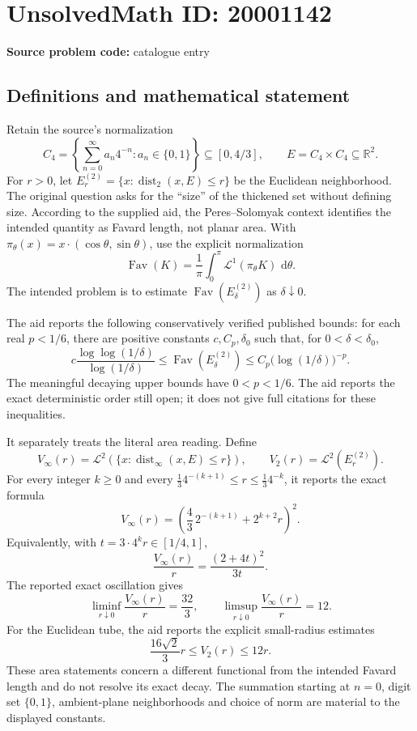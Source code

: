 \documentclass[11pt]{article}
\newcommand{\R}{\mathbb{R}}
\newcommand{\dd}{\,\mathrm{d}}
\begin{document}
\section*{UnsolvedMath ID: 20001142}
\textbf{Source problem code:} catalogue entry
\subsection{Definitions and mathematical statement}
Retain the source's normalization
\[
 C_4=\left\{\sum_{n=0}^{\infty}a_n4^{-n}:a_n\in\{0,1\}\right\}\subseteq[0,4/3],
 \qquad E=C_4\times C_4\subseteq\R^2.
\]
For \(r>0\), let \(E_r^{(2)}=\{x:\operatorname{dist}_2(x,E)\leq r\}\) be the Euclidean neighborhood. The original question asks for the ``size'' of the thickened set without defining size. According to the supplied aid, the Peres--Solomyak context identifies the intended quantity as Favard length, not planar area. With \(\pi_\theta(x)=x\cdot(\cos\theta,\sin\theta)\), use the explicit normalization
\[
 \operatorname{Fav}(K)=\frac1\pi\int_0^\pi\mathcal L^1(\pi_\theta K)\,\dd\theta.
\]
The intended problem is to estimate \(\operatorname{Fav}(E_\delta^{(2)})\) as \(\delta\downarrow0\).

The aid reports the following conservatively verified published bounds: for each real \(p<1/6\), there are positive constants \(c,C_p,\delta_0\) such that, for \(0<\delta<\delta_0\),
\[
 c\frac{\log\log(1/\delta)}{\log(1/\delta)}
 \leq\operatorname{Fav}(E_\delta^{(2)})
 \leq C_p\bigl(\log(1/\delta)\bigr)^{-p}.
\]
The meaningful decaying upper bounds have \(0<p<1/6\). The aid reports the exact deterministic order still open; it does not give full citations for these inequalities.

It separately treats the literal area reading. Define
\[
 V_\infty(r)=\mathcal L^2(\{x:\operatorname{dist}_\infty(x,E)\leq r\}),\qquad
 V_2(r)=\mathcal L^2(E_r^{(2)}).
\]
For every integer \(k\geq0\) and every
\(\frac13 4^{-(k+1)}\leq r\leq\frac13 4^{-k}\), it reports the exact formula
\[
 V_\infty(r)=\left(\frac43\,2^{-(k+1)}+2^{k+2}r\right)^2.
\]
Equivalently, with \(t=3\cdot4^kr\in[1/4,1]\),
\[
 \frac{V_\infty(r)}r=\frac{(2+4t)^2}{3t}.
\]
The reported exact oscillation gives
\[
 \liminf_{r\downarrow0}\frac{V_\infty(r)}r=\frac{32}{3},\qquad
 \limsup_{r\downarrow0}\frac{V_\infty(r)}r=12.
\]
For the Euclidean tube, the aid reports the explicit small-radius estimates
\[
 \frac{16\sqrt2}{3}r\leq V_2(r)\leq12r.
\]
These area statements concern a different functional from the intended Favard length and do not resolve its exact decay. The summation starting at \(n=0\), digit set \(\{0,1\}\), ambient-plane neighborhoods and choice of norm are material to the displayed constants.
\end{document}
